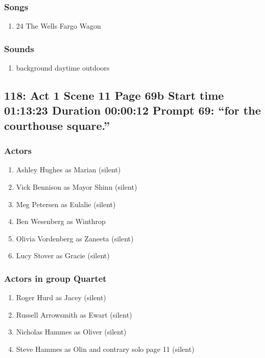 \subsubsection{Songs}
\begin{enumerate}
\item 24 The Wells Fargo Wagon
\end{enumerate}\subsubsection{Sounds}
\begin{enumerate}
\item background daytime outdoors
\end{enumerate}
\subsection{118: Act 1 Scene 11 Page 69b Start time 01:13:23 Duration 00:00:12 Prompt 69: ``for the courthouse square.''}

\subsubsection{Actors}
\begin{enumerate}
\item Ashley Hughes as Marian (silent)
\item Vick Bennison as Mayor Shinn (silent)
\item Meg Petersen as Eulalie (silent)
\item Ben Wesenberg as Winthrop
\item Olivia Vordenberg as Zaneeta (silent)
\item Lucy Stover as Gracie (silent)
\end{enumerate}
\subsubsection{Actors in group Quartet}
\begin{enumerate}
\item Roger Hurd as Jacey (silent)
\item Russell Arrowsmith as Ewart (silent)
\item Nicholas Hammes as Oliver (silent)
\item Steve Hammes as Olin and contrary solo page 11 (silent)
\end{enumerate}
